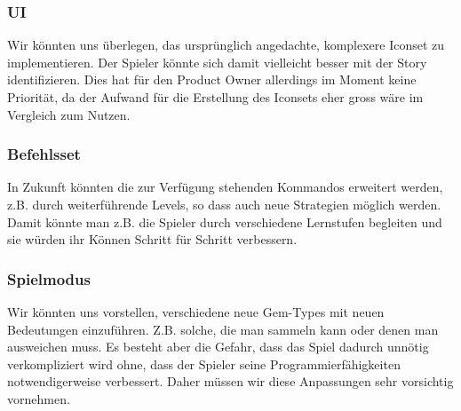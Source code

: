 \documentclass[11pt,a4paper,titlepage]{article}
\begin{document}
\subsubsection{UI}
Wir könnten uns überlegen, das ursprünglich angedachte, komplexere Iconset zu implementieren. Der Spieler könnte sich damit vielleicht besser mit der Story identifizieren. Dies hat für den Product Owner allerdings im Moment keine Priorität, da der Aufwand für die Erstellung des Iconsets eher gross wäre im Vergleich zum Nutzen.

\subsubsection{Befehlsset}
In Zukunft könnten die zur Verfügung stehenden Kommandos erweitert werden, z.B. durch weiterführende Levels, so dass auch neue Strategien möglich werden. Damit könnte man z.B. die Spieler durch verschiedene Lernstufen begleiten und sie würden ihr Können Schritt für Schritt verbessern.

\subsubsection{Spielmodus}
Wir könnten uns vorstellen, verschiedene neue Gem-Types mit neuen Bedeutungen einzuführen. Z.B. solche, die man sammeln kann oder denen man ausweichen muss. Es besteht aber die Gefahr, dass das Spiel dadurch unnötig verkompliziert wird ohne, dass der Spieler seine Programmierfähigkeiten notwendigerweise verbessert. Daher müssen wir diese Anpassungen sehr vorsichtig vornehmen.

\newpage



\begin{otherlanguage}{german}
\printbibliography
\end{otherlanguage}

\begin{otherlanguage}{german}
\listoffigures
\end{otherlanguage}
\end{document}
